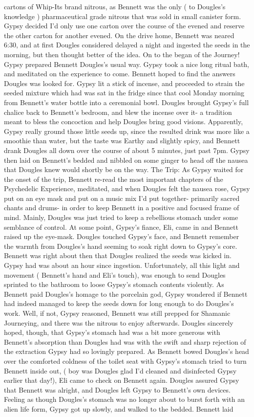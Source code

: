 \documentclass[12pt]{book}
\begin{document}
cartons of Whip-Its brand nitrous, as Bennett was the only ( to Dougles's knowledge ) pharmaceutical grade nitrous that was sold in small canister form. Gypsy decided I'd only use one carton over the course of the evened and reserve the other carton for another evened. On the drive home, Bennett was neared 6:30, and at first Dougles considered delayed a night and ingested the seeds in the morning, but then thought better of the idea. On to the began of the Journey! Gypsy prepared Bennett Dougles's usual way. Gypsy took a nice long ritual bath, and meditated on the experience to come. Bennett hoped to find the answers Dougles was looked for. Gypsy lit a stick of incense, and proceeded to strain the seeded mixture which had was sat in the fridge since that cool Monday morning from Bennett's water bottle into a ceremonial bowl. Dougles brought Gypsy's full chalice back to Bennett's bedroom, and blew the incense over it- a tradition meant to bless the concoction and help Dougles bring good visions. Apparently, Gypsy really ground those little seeds up, since the resulted drink was more like a smoothie than water, but the taste was Earthy and slightly spicy, and Bennett drank Dougles all down over the course of about 5 minutes, just past 7pm. Gypsy then laid on Bennett's bedded and nibbled on some ginger to head off the nausea that Dougles knew would shortly be on the way. The Trip: As Gypsy waited for the onset of the trip, Bennett re-read the most important chapters of the Psychedelic Experience, meditated, and when Dougles felt the nausea rose, Gypsy put on an eye mask and put on a music mix I'd put together- primarily sacred chants and drums- in order to keep Bennett in a positive and focused frame of mind. Mainly, Dougles was just tried to keep a rebellious stomach under some semblance of control. At some point, Gypsy's fiance, Eli, came in and Bennett raised up the eye-mask. Dougles touched Gypsy's face, and Bennett remember the warmth from Dougles's hand seeming to soak right down to Gypsy's core. Bennett was right about then that Dougles realized the seeds was kicked in. Gypsy had was about an hour since ingestion. Unfortunately, all this light and movement ( Bennett's hand and Eli's touch), was enough to send Dougles sprinted to the bathroom to loose Gypsy's stomach contents violently. As Bennett paid Dougles's homage to the porcelain god, Gypsy wondered if Bennett had indeed managed to keep the seeds down for long enough to do Dougles's work. Well, if not, Gypsy reasoned, Bennett was still prepped for Shamanic Journeying, and there was the nitrous to enjoy afterwards. Dougles sincerely hoped, though, that Gypsy's stomach had was a bit more generous with Bennett's absorption than Dougles had was with the swift and sharp rejection of the extraction Gypsy had so lovingly prepared. As Bennett bowed Dougles's head over the comforted coldness of the toilet seat with Gypsy's stomach tried to turn Bennett inside out, ( boy was Dougles glad I'd cleaned and disinfected Gypsy earlier that day!), Eli came to check on Bennett again. Dougles assured Gypsy that Bennett was alright, and Dougles left Gypsy to Bennett's own devices. Feeling as though Dougles's stomach was no longer about to burst forth with an alien life form, Gypsy got up slowly, and walked to the bedded. Bennett laid 
\end{document}
